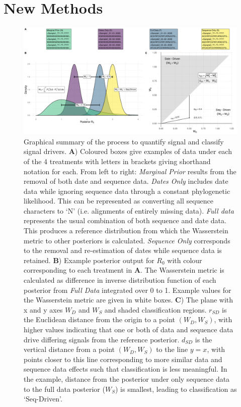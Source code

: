\documentclass{article}
\begin{document}
\section*{New Methods}


\begin{figure}[H]
\centering
\includegraphics[width=1\linewidth]{../figures/graphicalMethods.pdf}
\caption{Graphical summary of the process to quantify signal and classify signal drivers.  \textbf{A}) Coloured boxes give examples of data under each of the 4 treatments with letters in brackets giving shorthand notation for each. From left to right: \emph{Marginal Prior} results from the removal of both date and sequence data. \emph{Dates Only} includes date data while ignoring sequence data through a constant phylogenetic likelihood. This can be represented as converting all sequence characters to `N' (i.e. alignments of entirely missing data). \emph{Full data} represents the usual combination of both sequence and date data. This produces a reference distribution from which the Wasserstein metric to other posteriors is calculated. \emph{Sequence Only} corresponds to the removal and re-estimation of dates while sequence data is retained. \textbf{B}) Example posterior output for $R_0$ with colour corresponding to each treatment in \textbf{A}. The Wasserstein metric is calculated as difference in inverse distribution function of each posterior from \emph{Full Data} integrated over 0 to 1. Example values for the Wasserstein metric are given in white boxes. \textbf{C}) The plane with x and y axes $W_D$ and $W_S$ and shaded classification regions. $r_{SD}$ is the Euclidean distance from the origin to a point $(W_D, W_S)$, with higher values indicating that one or both of data and sequence data drive differing signals from the reference posterior. $d_{SD}$ is the vertical distance from a point $(W_D, W_S)$ to the line $y=x$, with points closer to this line corresponding to more similar data and sequence data effects such that classification is less meaningful. In the example, distance from the posterior under only sequence data to the full data posterior ($W_S$) is smallest, leading to classification as `Seq-Driven'.}
\label{fig:method}
\end{figure}
\end{document}
